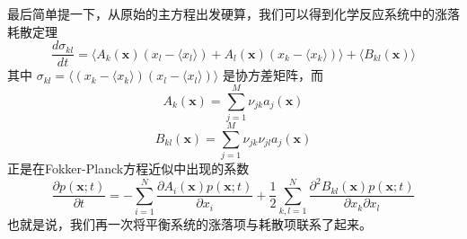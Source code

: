 \documentclass{ctexart}
\begin{document}
最后简单提一下，从原始的主方程出发硬算，我们可以得到化学反应系统中的涨落耗散定理
\begin{equation}
\frac{d\sigma_{kl}}{dt}=\langle A_k(\bm{x})(x_l-\langle x_l\rangle)+A_l(\bm{x})(x_k-\langle x_k\rangle)\rangle+\langle B_{kl}(\bm{x})\rangle
\end{equation}
其中 $\sigma_{kl}=\langle(x_k-\langle x_k\rangle)(x_l-\langle x_l\rangle)\rangle$ 是协方差矩阵，而
\begin{equation}
A_k(\bm{x})=\sum_{j=1}^M \nu_{jk}a_j(\bm{x})
\end{equation}
\begin{equation}
B_{kl}(\bm{x})=\sum_{j=1}^M \nu_{jk}\nu_{jl}a_j(\bm{x})
\end{equation}
正是在Fokker-Planck方程近似中出现的系数
\begin{equation}
\frac{\partial p(\bm{x};t)}{\partial t}=-\sum_{i=1}^N\frac{\partial A_i(\bm{x})p(\bm{x};t)}{\partial x_i}+\frac{1}{2}\sum_{k,l=1}^N \frac{\partial^2 B_{kl}(\bm{x})p(\bm{x};t)}{\partial x_k\partial x_l}
\end{equation}
也就是说，我们再一次将平衡系统的涨落项与耗散项联系了起来。
\end{document}
